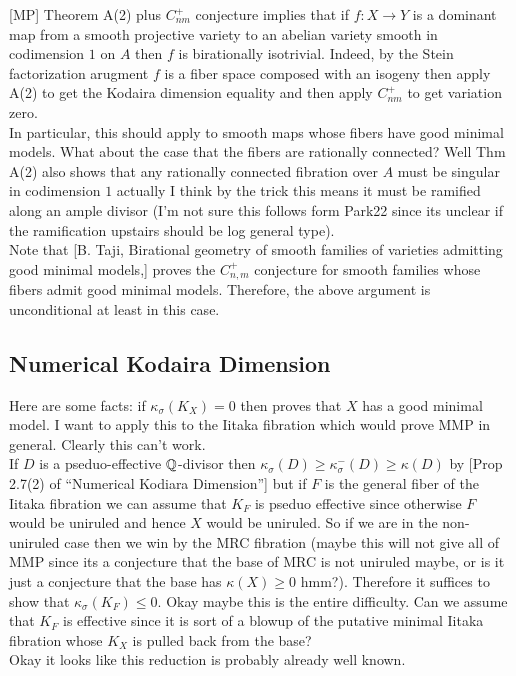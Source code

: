 \documentclass[12pt]{article}
\begin{document}
[MP] Theorem A(2) plus $C^+_{nm}$ conjecture implies that if $f : X \to Y$ is a dominant map from a smooth projective variety to an abelian variety smooth in codimension $1$ on $A$ then $f$ is birationally isotrivial. Indeed, by the Stein factorization arugment $f$ is a fiber space composed with an isogeny then apply A(2) to get the Kodaira dimension equality and then apply $C^+_{nm}$ to get variation zero. 
\bigskip\\
In particular, this should apply to smooth maps whose fibers have good minimal models. What about the case that the fibers are rationally connected? Well Thm A(2) also shows that any rationally connected fibration over $A$ must be singular in codimension $1$ actually I think by the trick this means it must be ramified along an ample divisor (I'm not sure this follows form Park22 since its unclear if the ramification upstairs should be log general type). 
\bigskip\\
Note that [B. Taji, Birational geometry of smooth families of varieties admitting good minimal models,] proves the $C^+_{n,m}$ conjecture for smooth families whose fibers admit good minimal models. Therefore, the above argument is unconditional at least in this case.

\subsection{Numerical Kodaira Dimension}

Here are some facts: if $\kappa_\sigma(K_X) = 0$ then  proves that $X$ has a good minimal model. I want to apply this to the Iitaka fibration which would prove MMP in general. Clearly this can't work.
\bigskip\\
If $D$ is a pseduo-effective $\mathbb{Q}$-divisor then $\kappa_{\sigma}(D) \ge \kappa_{\sigma}^{-}(D) \ge \kappa(D)$ by [Prop 2.7(2) of ``Numerical Kodiara Dimension''] but if $F$ is the general fiber of the Iitaka fibration we can assume that $K_F$ is pseduo effective since otherwise $F$ would be uniruled and hence $X$ would be uniruled. So if we are in the non-uniruled case then we win by the MRC fibration (maybe this will not give all of MMP since its a conjecture that the base of MRC is not uniruled maybe, or is it just a conjecture that the base has $\kappa(X) \ge 0$ hmm?). Therefore it suffices to show that $\kappa_{\sigma}(K_F) \le 0$. Okay maybe this is the entire difficulty. Can we assume that $K_F$ is effective since it is sort of a blowup of the putative minimal Iitaka fibration whose $K_X$ is pulled back from the base? 
\bigskip\\
Okay it looks like this reduction is probably already well known. 
\end{document}
